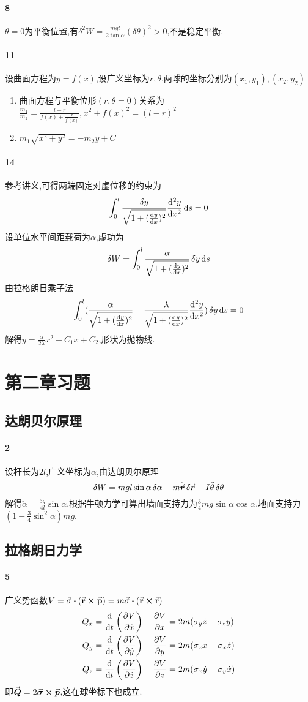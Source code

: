 \documentclass[a4paper]{article}
\begin{document}
\paragraph{8}
$\theta=0$为平衡位置,有$\delta^2W=\frac{mgl}{2\tan\alpha}(\delta\theta)^2>0$,不是稳定平衡.
\paragraph{11}
设曲面方程为$y=f(x)$,设广义坐标为$r,\theta$,两球的坐标分别为$(x_1,y_1),(x_2,y_2)$
\begin{enumerate}
    \item 曲面方程与平衡位形$(r,\theta=0)$关系为$\frac{m_1}{m_2}=\frac{l-r}{f(x)+\frac{x}{f^\prime(x)}},x^2+f(x)^2=(l-r)^2$
    \item $m_1\sqrt{x^2+y^2}=-m_2y+C$
\end{enumerate}
\paragraph{14}
参考讲义,可得两端固定对虚位移的约束为
$$\int_0^l\frac{\var{y}}{\sqrt{1+(\dv{y}{x})^2}}\dv[2]{y}{x}\dd{s}=0$$
设单位水平间距载荷为$\alpha$,虚功为
$$\var{W}=\int_0^l\frac{\alpha}{\sqrt{1+(\dv{y}{x})^2}}\var{y}\dd{s}$$
由拉格朗日乘子法
$$\int_0^l(\frac{\alpha}{\sqrt{1+(\dv{y}{x})^2}}-\frac{\lambda}{\sqrt{1+(\dv{y}{x})^2}}\dv[2]{y}{x})\var{y}\dd{s}=0$$
解得$y=\frac{\alpha}{2\lambda}x^2+C_1x+C_2$,形状为抛物线.
\section{第二章习题}
\subsection{达朗贝尔原理}
\paragraph{2}
设杆长为$2l$,广义坐标为$\alpha$,由达朗贝尔原理
$$\var{W}=mgl\sin\alpha\var{\alpha}-m\ddot{\va*{r}}\var{\va*{r}}-I\ddot{\theta}\var{\theta}$$
解得$\ddot{\alpha}=\frac{3g}{4l}\sin\alpha$,根据牛顿力学可算出墙面支持力为$\frac{3}{4}mg\sin\alpha\cos\alpha$,地面支持力$(1-\frac{3}{4}\sin^2\alpha)mg$.
\subsection{拉格朗日力学}
\paragraph{5}
广义势函数$V=\va{\sigma}\dotproduct(\va{r}\crossproduct\va{p})=m\va{\sigma}\dotproduct(\va{r}\crossproduct\va{r})$
\begin{align*}
    Q_x&=\dv{}{t}\left(\pdv{V}{\dot{x}}\right)-\pdv{V}{x}=2m(\sigma_y\dot{z}-\sigma_z\dot{y}) \\
    Q_y&=\dv{}{t}\left(\pdv{V}{\dot{y}}\right)-\pdv{V}{y}=2m(\sigma_z\dot{x}-\sigma_x\dot{z}) \\
    Q_z&=\dv{}{t}\left(\pdv{V}{\dot{z}}\right)-\pdv{V}{z}=2m(\sigma_x\dot{y}-\sigma_y\dot{x})
\end{align*}
即$\va*{Q}=2\va*{\sigma}\crossproduct\va*{p}$,这在球坐标下也成立.
\end{document}
